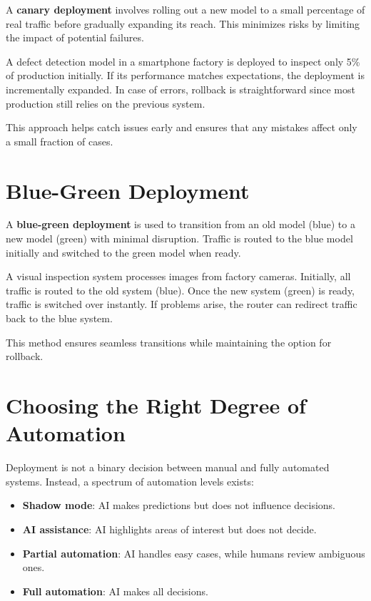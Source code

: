 \documentclass[12pt,openany, draft]{book}
\begin{document}
A \textbf{canary deployment} involves rolling out a new model to a small percentage of real traffic before gradually expanding its reach. This minimizes risks by limiting the impact of potential failures.

\begin{examplebox}
   A defect detection model in a smartphone factory is deployed to inspect only 5\% of production initially. If its performance matches expectations, the deployment is incrementally expanded. In case of errors, rollback is straightforward since most production still relies on the previous system.
\end{examplebox}

This approach helps catch issues early and ensures that any mistakes affect only a small fraction of cases.



\section{Blue-Green Deployment}

A \textbf{blue-green deployment} is used to transition from an old model (blue) to a new model (green) with minimal disruption. Traffic is routed to the blue model initially and switched to the green model when ready.

\begin{examplebox}
   A visual inspection system processes images from factory cameras. Initially, all traffic is routed to the old system (blue). Once the new system (green) is ready, traffic is switched over instantly. If problems arise, the router can redirect traffic back to the blue system.
\end{examplebox}

This method ensures seamless transitions while maintaining the option for rollback.



\section{Choosing the Right Degree of Automation}

Deployment is not a binary decision between manual and fully automated systems. Instead, a spectrum of automation levels exists:

\begin{itemize}
    \item \textbf{Shadow mode}: AI makes predictions but does not influence decisions.
    \item \textbf{AI assistance}: AI highlights areas of interest but does not decide.
    \item \textbf{Partial automation}: AI handles easy cases, while humans review ambiguous ones.
    \item \textbf{Full automation}: AI makes all decisions.
\end{itemize}
\end{document}

